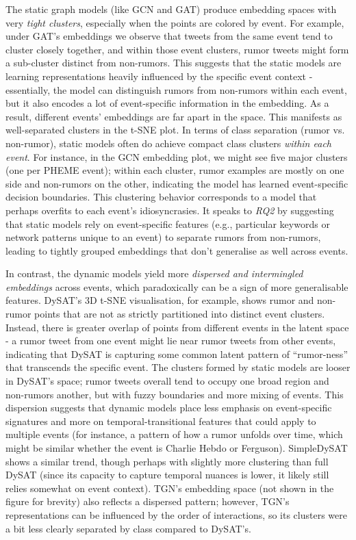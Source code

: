 \documentclass{cshonours}
\begin{document}
The static graph models (like GCN and GAT) produce embedding spaces with very \emph{tight clusters}, especially when the points are colored by event. For example, under GAT's embeddings we observe that tweets from the same event tend to cluster closely together, and within those event clusters, rumor tweets might form a sub-cluster distinct from non-rumors. This suggests that the static models are learning representations heavily influenced by the specific event context - essentially, the model can distinguish rumors from non-rumors within each event, but it also encodes a lot of event-specific information in the embedding. As a result, different events' embeddings are far apart in the space. This manifests as well-separated clusters in the t-SNE plot. In terms of class separation (rumor vs. non-rumor), static models often do achieve compact class clusters \emph{within each event}. For instance, in the GCN embedding plot, we might see five major clusters (one per PHEME event); within each cluster, rumor examples are mostly on one side and non-rumors on the other, indicating the model has learned event-specific decision boundaries. This clustering behavior corresponds to a model that perhaps overfits to each event's idiosyncrasies. It speaks to \emph{RQ2} by suggesting that static models rely on event-specific features (e.g., particular keywords or network patterns unique to an event) to separate rumors from non-rumors, leading to tightly grouped embeddings that don't generalise as well across events.



In contrast, the dynamic models yield more \emph{dispersed and intermingled embeddings} across events, which paradoxically can be a sign of more generalisable features. DySAT's 3D t-SNE visualisation, for example, shows rumor and non-rumor points that are not as strictly partitioned into distinct event clusters. Instead, there is greater overlap of points from different events in the latent space - a rumor tweet from one event might lie near rumor tweets from other events, indicating that DySAT is capturing some common latent pattern of ``rumor-ness'' that transcends the specific event. The clusters formed by static models are looser in DySAT's space; rumor tweets overall tend to occupy one broad region and non-rumors another, but with fuzzy boundaries and more mixing of events. This dispersion suggests that dynamic models place less emphasis on event-specific signatures and more on temporal-transitional features that could apply to multiple events (for instance, a pattern of how a rumor unfolds over time, which might be similar whether the event is Charlie Hebdo or Ferguson). SimpleDySAT shows a similar trend, though perhaps with slightly more clustering than full DySAT (since its capacity to capture temporal nuances is lower, it likely still relies somewhat on event context). TGN's embedding space (not shown in the figure for brevity) also reflects a dispersed pattern; however, TGN's representations can be influenced by the order of interactions, so its clusters were a bit less clearly separated by class compared to DySAT's.
\end{document}
